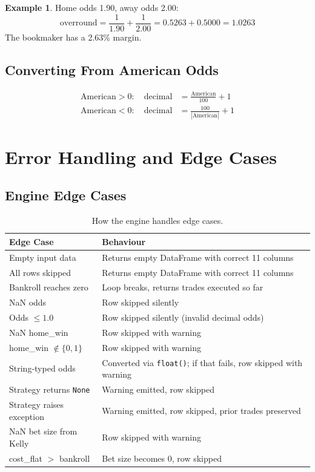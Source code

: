 \documentclass[12pt,a4paper]{report}
\theoremstyle{definition}
\newtheorem{example}{Example}[chapter]
\newcommand{\code}[1]{\texttt{#1}}
\begin{document}
\begin{example}
Home odds 1.90, away odds 2.00:
\[
    \text{overround} = \frac{1}{1.90} + \frac{1}{2.00} = 0.5263 + 0.5000 = 1.0263
\]
The bookmaker has a 2.63\% margin.
\end{example}

\section{Converting From American Odds}

\begin{align}
    \text{American} > 0: \quad \text{decimal} &= \frac{\text{American}}{100} + 1 \\
    \text{American} < 0: \quad \text{decimal} &= \frac{100}{|\text{American}|} + 1
\end{align}


\chapter{Error Handling and Edge Cases}
\label{ch:edge-cases}

\section{Engine Edge Cases}

\begin{table}[H]
\centering
\caption{How the engine handles edge cases.}
\label{tab:edge-cases}
\begin{tabularx}{\textwidth}{lX}
\toprule
\textbf{Edge Case} & \textbf{Behaviour} \\
\midrule
Empty input data & Returns empty DataFrame with correct 11 columns \\
All rows skipped & Returns empty DataFrame with correct 11 columns \\
Bankroll reaches zero & Loop breaks, returns trades executed so far \\
NaN odds & Row skipped silently \\
Odds $\leq 1.0$ & Row skipped silently (invalid decimal odds) \\
NaN home\_win & Row skipped with warning \\
home\_win $\notin \{0, 1\}$ & Row skipped with warning \\
String-typed odds & Converted via \code{float()}; if that fails, row skipped with warning \\
Strategy returns \code{None} & Warning emitted, row skipped \\
Strategy raises exception & Warning emitted, row skipped, prior trades preserved \\
NaN bet size from Kelly & Row skipped with warning \\
cost\_flat $>$ bankroll & Bet size becomes 0, row skipped \\
\bottomrule
\end{tabularx}
\end{table}
\end{document}
